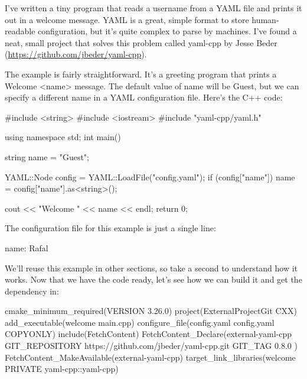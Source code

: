 
I’ve written a tiny program that reads a username from a YAML file and prints it out in a welcome message. YAML is a great, simple format to store human-readable configuration, but it’s quite complex to parse by machines. I’ve found a neat, small project that solves this problem called yaml-cpp by Jesse Beder (\url{https://github.com/jbeder/yaml-cpp}).

The example is fairly straightforward. It’s a greeting program that prints a Welcome <name> message. The default value of name will be Guest, but we can specify a different name in a YAML configuration file. Here’s the C++ code:


\begin{cpp}
#include <string>
#include <iostream>
#include "yaml-cpp/yaml.h"

using namespace std;
int main() {
    string name = "Guest";

    YAML::Node config = YAML::LoadFile("config.yaml");
    if (config["name"])
        name = config["name"].as<string>();

    cout << "Welcome " << name << endl;
    return 0;
}
\end{cpp}

The configuration file for this example is just a single line:


\begin{shell}
name: Rafal
\end{shell}

We’ll reuse this example in other sections, so take a second to understand how it works. Now that we have the code ready, let’s see how we can build it and get the dependency in:


\begin{cmake}
cmake_minimum_required(VERSION 3.26.0)
project(ExternalProjectGit CXX)
add_executable(welcome main.cpp)
configure_file(config.yaml config.yaml COPYONLY)
include(FetchContent)
FetchContent_Declare(external-yaml-cpp
    GIT_REPOSITORY https://github.com/jbeder/yaml-cpp.git
    GIT_TAG 0.8.0
)
FetchContent_MakeAvailable(external-yaml-cpp)
target_link_libraries(welcome PRIVATE yaml-cpp::yaml-cpp)
\end{cmake}

